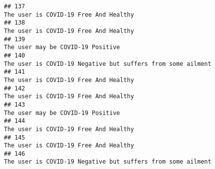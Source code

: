 \documentclass[
]{article}
\begin{document}
\begin{verbatim}
## 137                                                                                                                                                                                                                              The user is COVID-19 Free And Healthy
## 138                                                                                                                                                                                                                              The user is COVID-19 Free And Healthy
## 139                                                                                                                                                                                                                                  The user may be COVID-19 Positive
## 140                                                                                                                                                                                                        The user is COVID-19 Negative but suffers from some ailment
## 141                                                                                                                                                                                                                              The user is COVID-19 Free And Healthy
## 142                                                                                                                                                                                                                              The user is COVID-19 Free And Healthy
## 143                                                                                                                                                                                                                                  The user may be COVID-19 Positive
## 144                                                                                                                                                                                                                              The user is COVID-19 Free And Healthy
## 145                                                                                                                                                                                                                              The user is COVID-19 Free And Healthy
## 146                                                                                                                                                                                                        The user is COVID-19 Negative but suffers from some ailment

\end{verbatim}
\end{document}
